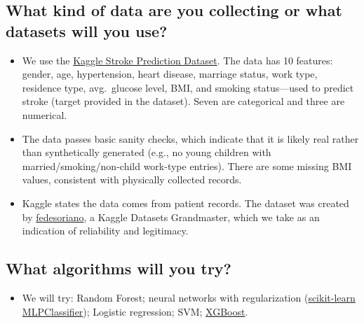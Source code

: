 \documentclass[11pt,a4paper]{article}
\begin{document}
\subsection*{What kind of data are you collecting or what datasets will you use?}
\begin{itemize}[leftmargin=*]
  \item We use the \href{https://www.kaggle.com/datasets/fedesoriano/stroke-prediction-dataset/data}{Kaggle Stroke Prediction Dataset}. The data has 10 features: gender, age, hypertension, heart disease, marriage status, work type, residence type, avg.\ glucose level, BMI, and smoking status---used to predict stroke (target provided in the dataset). Seven are categorical and three are numerical.
  \item The data passes basic sanity checks, which indicate that it is likely real rather than synthetically generated (e.g., no young children with married/smoking/non-child work-type entries). There are some missing BMI values, consistent with physically collected records.
  \item Kaggle states the data comes from patient records. The dataset was created by \href{https://www.kaggle.com/fedesoriano}{fedesoriano}, a Kaggle Datasets Grandmaster, which we take as an indication of reliability and legitimacy.
\end{itemize}

\subsection*{What algorithms will you try?}
\begin{itemize}[leftmargin=*]
  \item We will try: Random Forest; neural networks with regularization (\href{https://scikit-learn.org/stable/modules/neural_networks_supervised.html}{scikit-learn MLPClassifier}); Logistic regression; SVM; \href{https://xgboost.readthedocs.io/en/stable/}{XGBoost}.
\end{itemize}
\end{document}
